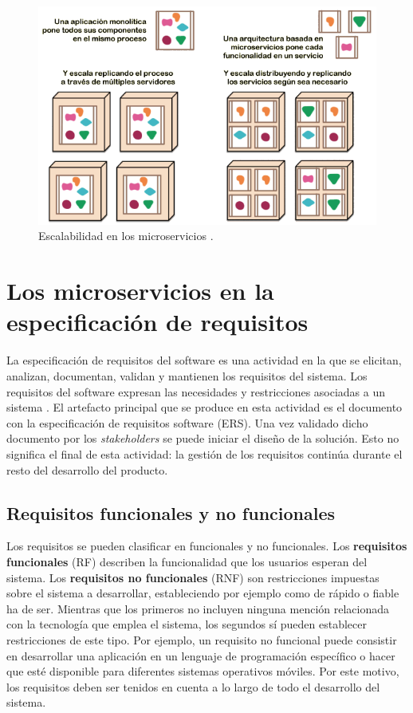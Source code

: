 \documentclass[11pt,spanish,listoffigures]{tfgetsinf}
\begin{document}
\begin{figure}[h]
\centering
\includegraphics[scale=1]{microservices_escaling_ES}
\caption{Escalabilidad en los microservicios \cite{Lewis2014}.}
\label{fig:microservices_escaling_ES}
\end{figure}

\section{Los microservicios en la especificación de requisitos}

La especificación de requisitos del software es una actividad en la que se elicitan, analizan, documentan, validan y mantienen los requisitos del sistema. Los requisitos del software expresan las necesidades y restricciones asociadas a un sistema \cite{Fernandes2016}. El artefacto principal que se produce en esta actividad es el documento con la especificación de requisitos software (ERS). Una vez validado dicho documento por los \textit{stakeholders} se puede iniciar el diseño de la solución. Esto no significa el final de esta actividad: la gestión de los requisitos continúa durante el resto del desarrollo del producto.

\subsection{Requisitos funcionales y no funcionales} \label{subsect:RNF}

Los requisitos se pueden clasificar en funcionales y no funcionales. Los \textbf{requisitos funcionales} (RF) describen la funcionalidad que los usuarios esperan del sistema. Los \textbf{requisitos no funcionales} (RNF) son restricciones impuestas sobre el sistema a desarrollar, estableciendo por ejemplo como de rápido o fiable ha de ser. Mientras que los primeros no incluyen ninguna mención relacionada con la tecnología que emplea el sistema, los segundos sí pueden establecer restricciones de este tipo. Por ejemplo, un requisito no funcional puede consistir en desarrollar una aplicación en un lenguaje de programación específico o hacer que esté disponible para diferentes sistemas operativos móviles. Por este motivo, los requisitos deben ser tenidos en cuenta a lo largo de todo el desarrollo del sistema.
\end{document}
